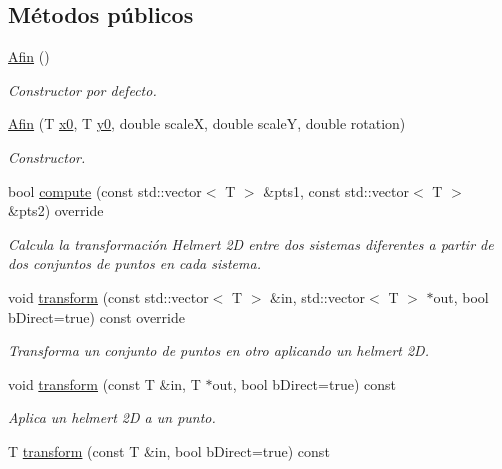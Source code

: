 \subsection*{Métodos públicos}
\begin{DoxyCompactItemize}
\item 
\hyperlink{class_i3_d_1_1_afin_ac54cf2d2c5335e8b05449ff56d2fd5fd}{Afin} ()
\begin{DoxyCompactList}\small\item\em Constructor por defecto. \end{DoxyCompactList}\item 
\hyperlink{class_i3_d_1_1_afin_a380364fda95636a4500637efd7cee797}{Afin} (T \hyperlink{class_i3_d_1_1_afin_aff62b2c4443c19c78940f4113e67183b}{x0}, T \hyperlink{class_i3_d_1_1_afin_ac687b5efb2b75262c7aeeb31a2792c34}{y0}, double scaleX, double scaleY, double rotation)
\begin{DoxyCompactList}\small\item\em Constructor. \end{DoxyCompactList}\item 
bool \hyperlink{group__trf2_d_group_gabe12d714c522dd1bf40f05f28c5aafe0}{compute} (const std\+::vector$<$ T $>$ \&pts1, const std\+::vector$<$ T $>$ \&pts2) override
\begin{DoxyCompactList}\small\item\em Calcula la transformación Helmert 2D entre dos sistemas diferentes a partir de dos conjuntos de puntos en cada sistema. \end{DoxyCompactList}\item 
void \hyperlink{group__trf2_d_group_gae1b65d232072a70d58ec72492a430521}{transform} (const std\+::vector$<$ T $>$ \&in, std\+::vector$<$ T $>$ $\ast$out, bool b\+Direct=true) const  override
\begin{DoxyCompactList}\small\item\em Transforma un conjunto de puntos en otro aplicando un helmert 2D. \end{DoxyCompactList}\item 
void \hyperlink{group__trf2_d_group_gaf2fb5278c5648034ef5f20c526866b77}{transform} (const T \&in, T $\ast$out, bool b\+Direct=true) const 
\begin{DoxyCompactList}\small\item\em Aplica un helmert 2D a un punto. \end{DoxyCompactList}\item 
T \hyperlink{group__trf2_d_group_ga8c7cfcf7b749b3adc69ebb6cfc0bb412}{transform} (const T \&in, bool b\+Direct=true) const 

\end{DoxyCompactItemize}
